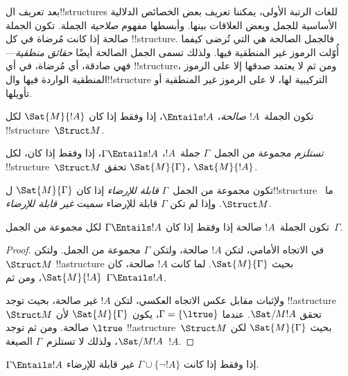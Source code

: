 \documentclass[../../../include/open-logic-section]{subfiles}
\begin{document}

\begin{explain}
بعد تعريف ال!!{structure}s للغات الرتبة الأولى، يمكننا تعريف بعض
الخصائص الدلالية الأساسية للجمل وبعض العلاقات بينها. وأبسطها مفهوم
\emph{صلاحية} الجملة. تكون الجملة صالحة إذا كانت مُرضاة في كل
!!{structure}. فالجمل الصالحة هي التي تُرضى كيفما أُوّلت الرموز غير
المنطقية فيها. ولذلك تسمى الجمل الصالحة أيضًا \emph{حقائق
منطقية}---فهي صادقة، أي مُرضاة، في أي !!{structure}، ومن ثم لا يعتمد
صدقها إلا على الرموز المنطقية الواردة فيها وال!!{structure} التركيبية لها، لا على
الرموز غير المنطقية أو تأويلها.
\end{explain}

\begin{defn}[الصلاحية]
تكون الجملة~$!A$ \emph{صالحة}، $\Entails !A$، إذا وفقط إذا كان
$\Sat{M}{!A}$ لكل !!{structure}~$\Struct M$.
\end{defn}

\begin{defn}[الاستلزام]
\emph{تستلزم} مجموعة من الجمل~$\Gamma$ جملة~$!A$،
$\Gamma \Entails !A$، إذا وفقط إذا كان، لكل
!!{structure}~$\Struct M$ تحقق $\Sat{M}{\Gamma}$،
$\Sat{M}{!A}$.
\end{defn}


\begin{defn}
تكون مجموعة من الجمل~$\Gamma$ \emph{قابلة للإرضاء} إذا كان
$\Sat{M}{\Gamma}$ ل!!{structure} ما~$\Struct M$. وإذا لم تكن
$\Gamma$ قابلة للإرضاء سميت \emph{غير قابلة للإرضاء}.
\end{defn}

\begin{prop}
تكون الجملة~$!A$ صالحة إذا وفقط إذا كان
$\Gamma \Entails !A$ لكل مجموعة من الجمل~$\Gamma$.
\end{prop}

\begin{proof}
في الاتجاه الأمامي، لتكن $!A$ صالحة، ولتكن $\Gamma$ مجموعة من
الجمل. ولتكن $\Struct M$ !!a{structure} بحيث
$\Sat{M}{\Gamma}$. لما كانت $!A$ صالحة، كان $\Sat{M}{!A}$، ومن
ثم $\Gamma \Entails !A$.

ولإثبات مقابل عكس الاتجاه العكسي، لتكن $!A$ غير صالحة، بحيث توجد
!!a{structure}~$\Struct M$ تحقق $\Sat/{M}{!A}$. عندما
$\Gamma = \{ \ltrue \}$، يكون $\Sat{M}{\Gamma}$ لأن
$\ltrue$ صالحة. ومن ثم توجد !!a{structure}~$\Struct M$ بحيث
$\Sat{M}{\Gamma}$ لكن $\Sat/{M}{!A}$، ولذلك لا تستلزم~$\Gamma$
الصيغة~$!A$.
\end{proof}

\begin{prop}
$\Gamma \Entails !A$ إذا وفقط إذا كانت
$\Gamma \cup \{\lnot !A\}$ غير قابلة للإرضاء.
\end{prop}
\end{document}
